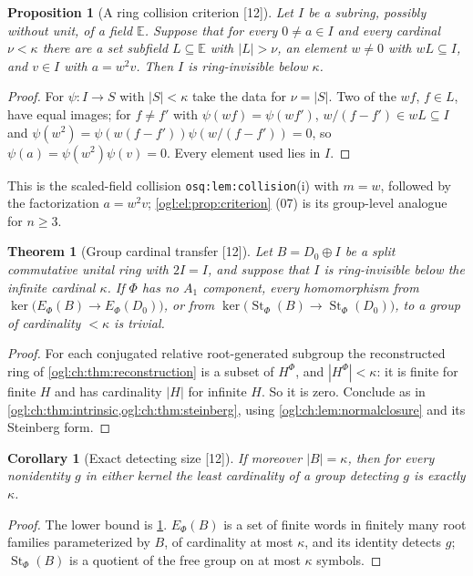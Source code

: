 \documentclass[11pt,oneside]{article}
\numberwithin{equation}{section}
\newtheorem{theorem}{Theorem}[section]
\newtheorem{proposition}[proposition]{Proposition}
\newtheorem{corollary}[corollary]{Corollary}
\theoremstyle{definition}
\theoremstyle{remark}
\newcommand{\St}{\operatorname{St}}
\newcommand{\src}[1]{\textup{\textsf{\small[#1]}}}
\newcommand{\replabel}[1]{\nolinkurl{#1}}
\begin{document}
\begin{proposition}[A ring collision criterion \src{12}]\label{ogl:ch:prop:collision}
Let $I$ be a subring, possibly without unit, of a field $\mathbb E$. Suppose that
for every $0\ne a\in I$ and every cardinal $\nu<\kappa$ there are a set subfield
$L\subseteq\mathbb E$ with $|L|>\nu$, an element $w\ne0$ with $wL\subseteq I$, and
$v\in I$ with $a=w^2v$. Then $I$ is ring-invisible below $\kappa$.
\end{proposition}
\begin{proof}
For $\psi:I\to S$ with $|S|<\kappa$ take the data for $\nu=|S|$. Two of the
$wf$, $f\in L$, have equal images; for $f\ne f'$ with
$\psi(wf)=\psi(wf')$, $w/(f-f')\in wL\subseteq I$ and
$\psi(w^2)=\psi(w(f-f'))\psi(w/(f-f'))=0$, so $\psi(a)=\psi(w^2)\psi(v)=0$. Every
element used lies in $I$.
\end{proof}

This is the scaled-field collision \replabel{osq:lem:collision}(i) with $m=w$,
followed by the factorization $a=w^2v$; \cref{ogl:el:prop:criterion} (07) is its
group-level analogue for $n\ge3$.

\begin{theorem}[Group cardinal transfer \src{12}]\label{ogl:ch:thm:cardinalgroup}
Let $B=D_0\oplus I$ be a split commutative unital ring with $2I=I$, and suppose
that $I$ is ring-invisible below the infinite cardinal $\kappa$. If $\Phi$ has no
$A_1$ component, every homomorphism from $\ker\bigl(E_\Phi(B)\to E_\Phi(D_0)\bigr)$,
or from $\ker\bigl(\St_\Phi(B)\to\St_\Phi(D_0)\bigr)$, to a group of cardinality
$<\kappa$ is trivial.
\end{theorem}
\begin{proof}
For each conjugated relative root-generated subgroup the reconstructed ring of
\cref{ogl:ch:thm:reconstruction} is a subset of $H^\Phi$, and $|H^\Phi|<\kappa$:
it is finite for finite $H$ and has cardinality $|H|$ for infinite $H$. So it is
zero. Conclude as in \cref{ogl:ch:thm:intrinsic,ogl:ch:thm:steinberg}, using
\cref{ogl:ch:lem:normalclosure} and its Steinberg form.
\end{proof}

\begin{corollary}[Exact detecting size \src{12}]\label{ogl:ch:cor:exactsize}
If moreover $|B|=\kappa$, then for every nonidentity $g$ in either kernel the
least cardinality of a group detecting $g$ is exactly $\kappa$.
\end{corollary}
\begin{proof}
The lower bound is \cref{ogl:ch:thm:cardinalgroup}. $E_\Phi(B)$ is a set of
finite words in finitely many root families parameterized by $B$, of cardinality
at most $\kappa$, and its identity detects $g$; $\St_\Phi(B)$ is a quotient of the
free group on at most $\kappa$ symbols.
\end{proof}
\end{document}
